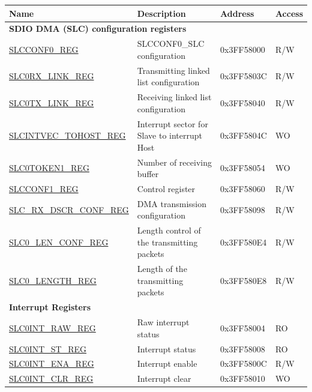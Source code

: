 


\begin{longtable}{ | p{5cm} | p{7cm} | p{2cm} | p{1cm} | }
\hline\rowcolor{lightgray}
Name & Description &  Address & Access \\ \hline
\multicolumn{4}{|l|}{\textbf{SDIO DMA (SLC) configuration registers}} \\ \hline
\hyperref[regdesc:SLCCONF0SLCCONF0REG]{SLCCONF0\_REG} & SLCCONF0\_SLC configuration& 0x3FF58000 & R/W \\ \hline
\hyperref[regdesc:SLC0RXLINKREG]{SLC0RX\_LINK\_REG} & Transmitting linked list configuration & 0x3FF5803C & R/W \\ \hline
\hyperref[regdesc:SLC0TXLINKREG]{SLC0TX\_LINK\_REG} & Receiving linked list configuration & 0x3FF58040 & R/W \\ \hline
\hyperref[regdesc:SLCINTVECTOHOSTREG]{SLCINTVEC\_TOHOST\_REG} & Interrupt sector for Slave to interrupt Host & 0x3FF5804C & WO \\ \hline
\hyperref[regdesc:SLC0TOKEN1SLC0TOKEN1REG]{SLC0TOKEN1\_REG} & Number of receiving buffer  & 0x3FF58054 & WO \\ \hline
\hyperref[regdesc:SLCCONF1SLCCONF1REG]{SLCCONF1\_REG}& Control register&0x3FF58060&R/W\\ \hline
\hyperref[regdesc:SLCRXDSCRCONFREG]{SLC\_RX\_DSCR\_CONF\_REG}&DMA transmission configuration&0x3FF58098&R/W\\ \hline
\hyperref[regdesc:SLC0LENCONFREG]{SLC0\_LEN\_CONF\_REG}&Length control of the transmitting packets &0x3FF580E4&R/W\\ \hline
\hyperref[regdesc:SLC0LENGTHREG]{SLC0\_LENGTH\_REG}&Length of the transmitting packets &0x3FF580E8&R/W\\ \hline
\multicolumn{4}{|l|}{\textbf{Interrupt Registers}} \\ \hline
\hyperref[regdesc:SLC0INTRAWREG]{SLC0INT\_RAW\_REG} & Raw interrupt status & 0x3FF58004 & RO \\ \hline
\hyperref[regdesc:SLC0INTSTREG]{SLC0INT\_ST\_REG} & Interrupt status & 0x3FF58008 & RO \\ \hline
\hyperref[regdesc:SLC0INTENAREG]{SLC0INT\_ENA\_REG} & Interrupt enable & 0x3FF5800C & R/W \\ \hline
\hyperref[regdesc:SLC0INTCLRREG]{SLC0INT\_CLR\_REG} & Interrupt clear & 0x3FF58010 & WO \\ \hline
\end{longtable}


